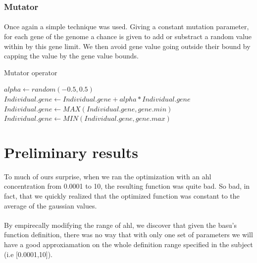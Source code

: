 \documentclass{article}
\begin{document}
    \subsubsection{Mutator} %
    \label{ssub:Mutator}
    
      \paragraph{} %
      \label{par:}
        Once again a simple technique was used. Giving a constant mutation parameter,
        for each gene of the genome a chance is given to add or substract a random value
        within by this gene limit. We then avoid gene value going outside their bound by
        capping the value by the gene value bounds.

      \begin{algorithm}
      \caption{Mutator operator}\label{pseudo2}
      \begin{algorithmic}[2]
          \State $alpha\gets random(-0.5, 0.5)$ 
          \State $Individual.gene\gets Individual.gene + alpha * Individual.gene$
          \State $Individual.gene\gets MAX(Individual.gene, gene.min)$
          \State $Individual.gene\gets MIN(Individual.gene, gene.max)$
        \EndIf
      \EndFor
      \EndProcedure
      \end{algorithmic}
      \end{algorithm}


  \section{Preliminary results} %
  \label{sec:Preliminaty Result}
    
    \paragraph{} %
    \label{par:}
      To much of ours surprise, when we ran the optimization with an ahl concentration
      from 0.0001 to 10, the resulting function was quite bad. So bad, in fact, that
      we quickly realized that the optimized function was constant to the average of
      the gaussian values.
    
    \paragraph{} %
    \label{par:}
      By empirecally modifying the range of ahl, we discover that given the basu's
      function definition, there was no way that with only one set of parameters we will
      have a good approxiamation on the whole definition range specified in the
      subject (i.e [0.0001,10]). 
\end{document}
